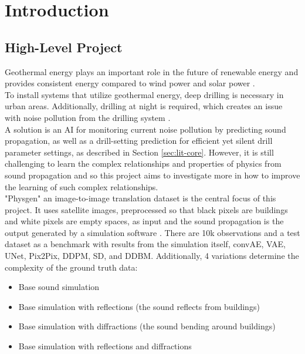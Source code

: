 \chapter{Introduction}
\label{cha:intro}
	
	
	
	\section{High-Level Project}
	\label{sec:intro-high_project}
		Geothermal energy plays an important role in the future of renewable energy and provides consistent energy compared to wind power and solar power \cite{geothermal_energy}\cite{herrenknecht_flyer}.\\
		To install systems that utilize geothermal energy, deep drilling is necessary in urban areas. Additionally, drilling at night is required, which creates an issue with noise pollution from the drilling system \cite{geothermal_energy}.\\
		A solution is an AI for monitoring current noise pollution by predicting sound propagation, as well as a drill-setting prediction for efficient yet silent drill parameter settings, as described in Section \ref{sec:lit-core}. However, it is still challenging to learn the complex relationships and properties of physics from sound propagation and so this project aims to investigate more in how to improve the learning of such complex relationships.\\
		"Physgen" an image-to-image translation dataset is the central focus of this project. It uses satellite images, preprocessed so that black pixels are buildings and white pixels are empty spaces, as input and the sound propagation is the output generated by a simulation software \cite{spitznagel_urban_2024-1}\cite{martin_spitznagel_physicsgen_2025}. There are 10k observations and a test dataset as a benchmark with results from the simulation itself, convAE, VAE, UNet, Pix2Pix, DDPM, SD, and DDBM. Additionally, 4 variations determine the complexity of the ground truth data:
		\begin{itemize}[itemsep=1mm, parsep=0pt]
			\item Base sound simulation
			\item Base simulation with reflections (the sound reflects from buildings)
			\item Base simulation with diffractions (the sound bending around buildings)
			\item Base simulation with reflections and diffractions
		\end{itemize}
	
